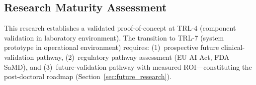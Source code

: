 
\subsection{Research Maturity Assessment}
\label{sec:research_maturity_assessment}

This research establishes a validated proof-of-concept at TRL-4 (component validation in laboratory environment). The transition to TRL-7 (system prototype in operational environment) requires: (1)~prospective future clinical-validation pathway, (2)~regulatory pathway assessment (EU AI Act, FDA SaMD), and (3)~future-validation pathway with measured ROI---constituting the post-doctoral roadmap (Section~\ref{sec:future_research}).


